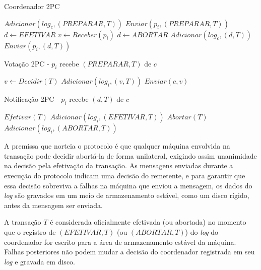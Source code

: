 \documentclass[11pt,twoside,a4paper]{book}
\begin{document}
\begin{algorithm}
\caption{Coordenador 2PC}
\label{alg:2pc_coordenador}
\begin{algorithmic}[1]
\State $Adicionar(log_c, (PREPARAR, T))$
	\State $Enviar(p_i, (PREPARAR, T))$
\EndFor
\State $d \gets EFETIVAR$
	\State $v \gets Receber(p_i)$
		\State $d \gets ABORTAR$
	\EndIf
\EndFor
\State $Adicionar(log_c, (d, T))$
	\State $Enviar(p_i, (d, T))$
\EndFor
\end{algorithmic}
\end{algorithm}

\begin{algorithm}
\caption{Votação 2PC - $p_i$ recebe $(PREPARAR, T)$ de $c$}
\label{alg:2pc_participante1}
\begin{algorithmic}[1]
\State $v \gets Decidir(T)$
\State $Adicionar(log_i, (v, T))$
\State $Enviar(c, v)$
\end{algorithmic}
\end{algorithm}

\begin{algorithm}
\caption{Notificação 2PC - $p_i$ recebe $(d, T)$ de $c$}
\label{alg:2pc_participante2}
\begin{algorithmic}[1]
	\State $Efetivar(T)$
	\State $Adicionar(log_i, (EFETIVAR, T))$
\Else
	\State $Abortar(T)$
	\State $Adicionar(log_i, (ABORTAR, T))$
\EndIf
\end{algorithmic}
\end{algorithm}

A premissa que norteia o protocolo é que qualquer máquina envolvida na transação pode decidir abortá-la de forma unilateral, exigindo assim unanimidade na decisão pela efetivação da transação. As mensagens enviadas durante a execução do protocolo indicam uma decisão do remetente, e para garantir que essa decisão sobreviva a falhas na máquina que enviou a mensagem, os dados do \emph{log} são gravados em um meio de armazenamento estável, como um disco rígido, antes da mensagem ser enviada.

A transação $T$ é considerada oficialmente efetivada (ou abortada) no momento que o registro de $(EFETIVAR, T)$ (ou $(ABORTAR, T)$) do \emph{log} do coordenador for escrito para a área de armazenamento estável da máquina. Falhas posteriores não podem mudar a decisão do coordenador registrada em seu \emph{log} e gravada em disco.
\end{document}
